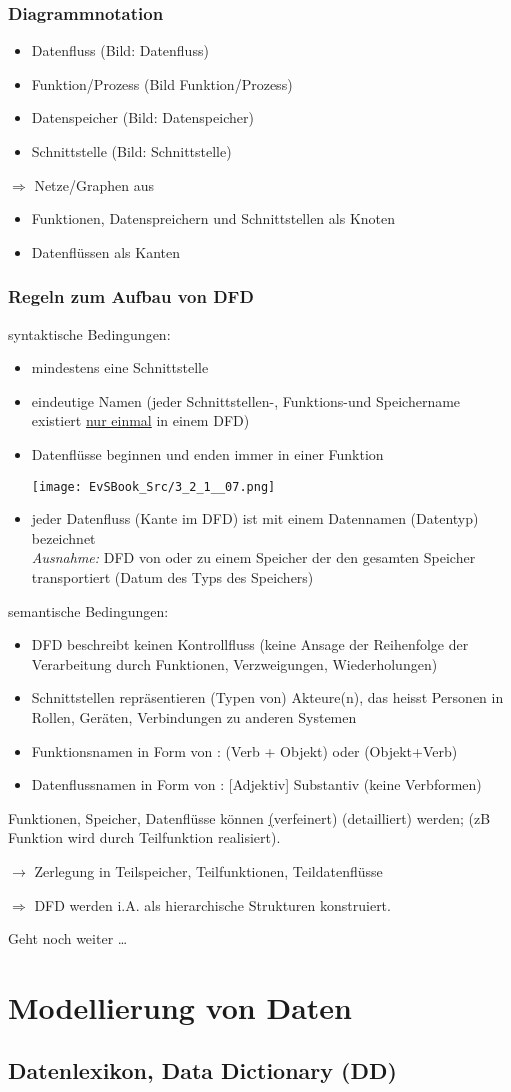\documentclass[10pt,a4paper]{book}
\begin{document}
\subsubsection*{Diagrammnotation}
\begin{itemize}
  \item Datenfluss (Bild: Datenfluss)
  \item Funktion/Prozess (Bild Funktion/Prozess)
  \item Datenspeicher (Bild: Datenspeicher)
  \item Schnittstelle (Bild: Schnittstelle)
\end{itemize}
$\Rightarrow$ Netze/Graphen aus
\begin{itemize}
  \item Funktionen, Datenspreichern und Schnittstellen als Knoten
  \item Datenflüssen als Kanten
\end{itemize}
\subsubsection*{Regeln zum Aufbau von DFD}
syntaktische Bedingungen:
\begin{itemize}
  \item mindestens eine Schnittstelle
  \item eindeutige Namen (jeder Schnittstellen-, Funktions-und Speichername existiert  \underline{nur einmal} in einem DFD) 
  \item Datenflüsse beginnen und enden immer in einer Funktion
  
   \texttt{[image: EvSBook\_Src/3\_2\_1\_\_07.png]}
  \item jeder Datenfluss (Kante im DFD) ist mit einem Datennamen (Datentyp) bezeichnet\\  \emph{Ausnahme:} DFD von oder zu einem Speicher der den gesamten Speicher transportiert (Datum des Typs des Speichers)
\end{itemize}
semantische Bedingungen:
\begin{itemize}
  \item DFD beschreibt keinen Kontrollfluss (keine Ansage der Reihenfolge der Verarbeitung durch Funktionen, Verzweigungen, Wiederholungen) 
  \item Schnittstellen repräsentieren (Typen von) Akteure(n), das heisst Personen in Rollen, Geräten, Verbindungen zu anderen Systemen 
  \item Funktionsnamen in Form von : (Verb + Objekt) oder (Objekt+Verb)
  \item Datenflussnamen in Form von : [Adjektiv] Substantiv (keine Verbformen) 
\end{itemize}
Funktionen, Speicher, Datenflüsse können \underline(verfeinert) (detailliert) werden; (zB Funktion wird durch Teilfunktion realisiert). 

$\rightarrow$ Zerlegung in Teilspeicher, Teilfunktionen, Teildatenflüsse

$\Rightarrow$ DFD werden i.A. als hierarchische Strukturen konstruiert.

Geht noch weiter \ldots
\section{Modellierung von Daten}
\subsection{Datenlexikon, Data Dictionary (DD)}
\end{document}
